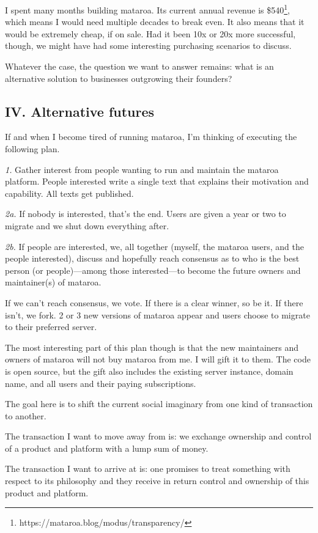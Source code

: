 I spent many months building mataroa. Its current annual revenue is \$540\footnote{https://mataroa.blog/modus/transparency/}, which means I would need multiple decades to break even. It also means that it would be extremely cheap, if on sale. Had it been 10x or 20x more successful, though, we might have had some interesting purchasing scenarios to discuss.

Whatever the case, the question we want to answer remains: what is an alternative solution to businesses outgrowing their founders?

\subsection{IV. Alternative futures}

If and when I become tired of running mataroa, I’m thinking of executing the following plan.

\emph{1.} Gather interest from people wanting to run and maintain the mataroa platform. People interested write a single text that explains their motivation and capability. All texts get published.

\emph{2a.} If nobody is interested, that’s the end. Users are given a year or two to migrate and we shut down everything after.

\emph{2b.} If people are interested, we, all together (myself, the mataroa users, and the people interested), discuss and hopefully reach consensus as to who is the best person (or people)—among those interested—to become the future owners and maintainer(s) of mataroa.

If we can’t reach consensus, we vote. If there is a clear winner, so be it. If there isn’t, we fork. 2 or 3 new versions of mataroa appear and users choose to migrate to their preferred server.

The most interesting part of this plan though is that the new maintainers and owners of mataroa will not buy mataroa from me. I will gift it to them. The code is open source, but the gift also includes the existing server instance, domain name, and all users and their paying subscriptions.

The goal here is to shift the current social imaginary from one kind of transaction to another.

The transaction I want to move away from is: we exchange ownership and control of a product and platform with a lump sum of money.

The transaction I want to arrive at is: one promises to treat something with respect to its philosophy and they receive in return control and ownership of this product and platform.

